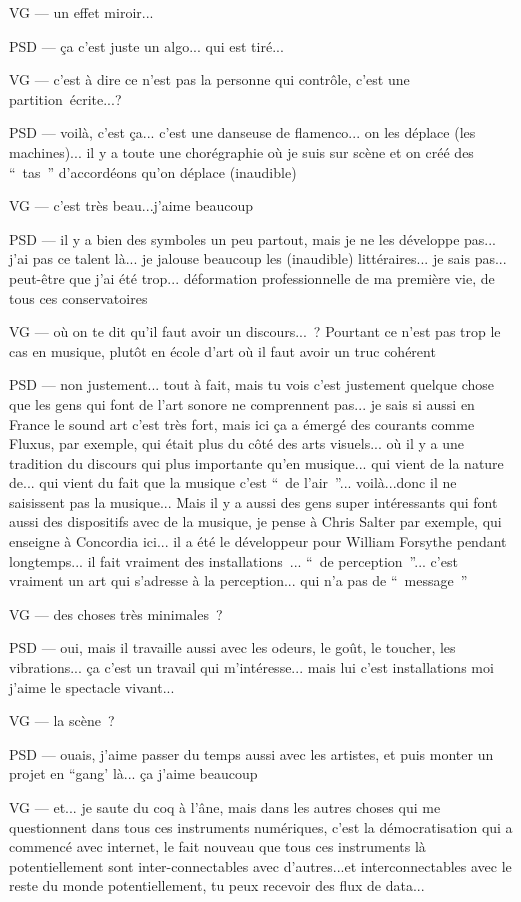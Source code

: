 VG — un effet miroir...

PSD — ça c'est juste un algo... qui est tiré...

VG — c'est à dire ce n'est pas la personne qui contrôle, c'est une partition écrite...?

PSD — voilà, c'est ça... c'est une danseuse de flamenco...  on les déplace (les machines)... il y a toute une chorégraphie où je suis sur scène et on créé des “ tas ” d'accordéons qu'on déplace (inaudible)

VG — c'est très beau...j'aime beaucoup

PSD — il y a bien des symboles un peu partout, mais je ne les développe pas... j'ai pas ce talent là... je jalouse beaucoup les (inaudible)  littéraires... je sais pas... peut-être que j'ai été trop... déformation professionnelle de ma première vie, de tous ces conservatoires

VG — où on te dit qu'il faut avoir un discours... ? Pourtant ce n'est pas trop le cas en musique, plutôt en école d'art où il faut avoir un truc cohérent

PSD — non justement... tout à fait, mais tu vois c'est justement quelque chose que les gens qui font de l'art sonore ne comprennent pas... je sais si aussi en France le sound art c'est très fort, mais ici ça a émergé des courants comme Fluxus, par exemple, qui était plus du côté des arts visuels... où il y a une tradition du discours qui plus importante qu'en musique... qui vient de la nature de... qui vient du fait que la musique c'est “ de l'air ”... voilà...donc  il ne saisissent pas la musique... Mais il y a aussi des gens super intéressants qui font aussi des dispositifs avec de la musique, je pense à Chris Salter par exemple, qui enseigne à Concordia ici... il a été le développeur pour William Forsythe pendant longtemps... il fait vraiment des installations ... “ de perception ”... c'est vraiment un art qui s'adresse à la  perception... qui n'a pas de “ message ”

VG — des choses très minimales ?

PSD — oui, mais il travaille aussi avec les odeurs, le goût, le toucher, les vibrations... ça c'est un travail qui m'intéresse... mais lui c'est installations moi j'aime le spectacle vivant...

VG — la scène ?

PSD — ouais, j'aime passer du temps aussi avec les artistes, et puis monter un projet en “gang' là... ça j'aime beaucoup

VG — et... je saute du coq à l'âne, mais dans les autres choses qui me questionnent dans tous ces instruments numériques, c'est la démocratisation qui a commencé avec internet, le fait nouveau que tous ces instruments là potentiellement sont inter-connectables avec d'autres...et interconnectables avec le reste du monde potentiellement, tu peux recevoir des flux de data...

